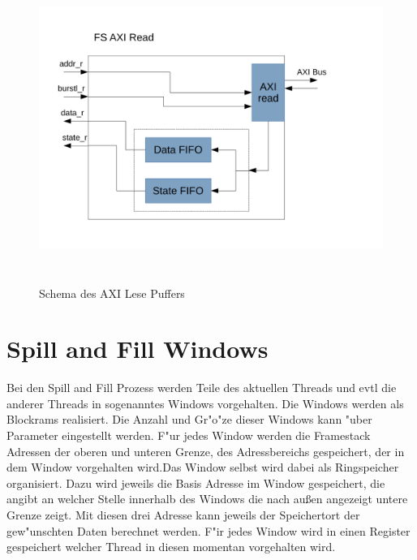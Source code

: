 \begin{figure}
	\centering
	\includegraphics[height = 10cm]{PS_RS_graphics/AxiReadBuffer.pdf}
	\caption{Schema des AXI Lese Puffers}
\end{figure}

\section{Spill and Fill Windows}

Bei den Spill and Fill Prozess werden Teile des aktuellen Threads  und evtl die anderer Threads in sogenanntes Windows vorgehalten. Die Windows werden als Blockrams realisiert. 
Die Anzahl und Gr"o"ze dieser Windows kann "uber Parameter eingestellt werden. F"ur jedes Window werden die Framestack Adressen der oberen und unteren Grenze, des Adressbereichs gespeichert, der in dem Window vorgehalten wird.Das Window selbst wird dabei als Ringspeicher organisiert. Dazu wird jeweils die Basis Adresse im Window gespeichert, die angibt an welcher Stelle innerhalb des Windows die nach außen angezeigt untere Grenze zeigt. Mit diesen drei Adresse kann jeweils der Speichertort der gew"unschten Daten berechnet werden. 
F"ir jedes Window wird in einen Register gespeichert welcher Thread in diesen momentan vorgehalten wird. 

